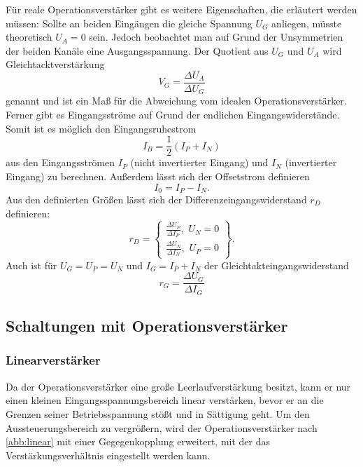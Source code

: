Für reale Operationsverstärker gibt es weitere Eigenschaften, die erläutert werden müssen:
Sollte an beiden Eingängen die gleiche Spannung $U_G$ anliegen, müsste theoretisch $U_A = 0$ sein. Jedoch beobachtet man auf Grund der Unsymmetrien der beiden Kanäle eine Ausgangsspannung.
Der Quotient aus $U_G$ und $U_A$ wird Gleichtacktverstärkung
\begin{equation}
V_G = \frac{\Delta U_A}{\Delta U_G}
\end{equation}
genannt und ist ein Maß für die Abweichung vom idealen Operationsverstärker.
Ferner gibt es Eingangsströme auf Grund der endlichen Eingangswiderstände. Somit ist es möglich den Eingangsruhestrom
\begin{equation}
I_B = \frac{1}{2} (I_P + I_N)
\end{equation}
aus den Eingangsströmen $I_P$ (nicht invertierter Eingang) und $I_N$ (invertierter Eingang) zu berechnen.
Außerdem lässt sich der Offsetstrom definieren
\begin{equation}
I_0 = I_P - I_N.
\end{equation}
Aus den definierten Größen lässt sich der Differenzeingangswiderstand $r_D$ definieren:
\begin{equation}
r_D = \left\{\begin{array}{ll} \frac{\Delta U_P}{\Delta I_P}, \, \, U_N = 0\\
	  \frac{\Delta U_N}{\Delta I_N}, \, \, U_P = 0\end{array}\right\}.
\end{equation}
Auch ist für $U_G = U_P = U_N$ und $I_G = I_P + I_N$ der Gleichtakteingangswiderstand
\begin{equation}
r_G = \frac{\Delta U_G}{\Delta I_G}
\end{equation}

\subsection{Schaltungen mit Operationsverst{\"a}rker}

\subsubsection{Linearverst{\"a}rker}
Da der Operationsverstärker eine große Leerlaufverstärkung besitzt, kann  er nur einen kleinen Eingangsspannungsbereich linear verstärken, bevor er an die Grenzen  seiner Betriebsspannung stößt und in Sättigung geht. Um den Aussteuerungsbereich zu vergrößern, wird der Operationsverstärker nach \autoref{abb:linear} mit einer Gegegenkopplung erweitert, mit der das Verstärkungsverhältnis eingestellt werden kann.

